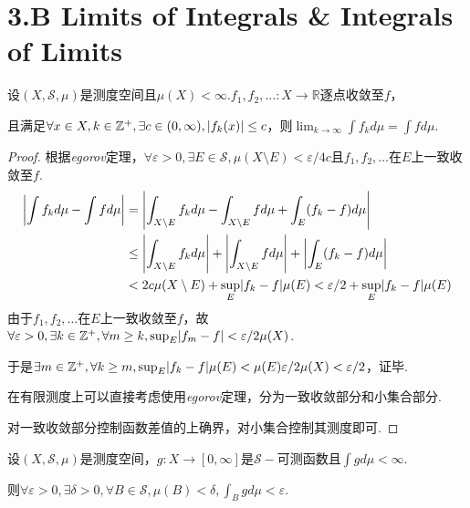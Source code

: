 \section{3.B Limits of Integrals \& Integrals of Limits}

\begin{theorem}[3.26]\label{3.26}
    设\((X, \mathcal{S}, \mu)\)是测度空间且\(\mu(X)<\infty\).\(f_1, f_2, \dots: X \to \mathbb{R}\)逐点收敛至\(f\)，
    
    且满足\(\forall x \in X, k \in \mathbb{Z}^+, \exists c \in (0,\infty), \abs*{f_k(x)} \leq c\)，则\(\lim_{k \to \infty} \int f_k d\mu=\int f d\mu\).
\end{theorem}

\begin{proof}
    根据\textit{egorov}定理，\(\forall \varepsilon>0, \exists E \in \mathcal{S}, \mu(X \setminus E)<\varepsilon/4c\)且\(f_1, f_2, \dots\)在\(E\)上一致收敛至\(f\).
    \begin{align*}
        \abs*{\int f_k d\mu-\int f d\mu}&=\abs*{\int_{X \setminus E} f_k d\mu-\int_{X \setminus E} f d\mu+\int_E (f_k-f) d\mu} \\
        &\leq \abs*{\int_{X \setminus E} f_k d\mu}+\abs*{\int_{X \setminus E} f d\mu}+\abs*{\int_E (f_k-f) d\mu} \\
        &<2c \mu(X \setminus E)+\sup_E \abs*{f_k-f} \mu(E)<\varepsilon/2+\sup_E \abs*{f_k-f} \mu(E)
    \end{align*}
    由于\(f_1, f_2, \dots\)在\(E\)上一致收敛至\(f\)，故\(\forall \varepsilon>0, \exists k \in \mathbb{Z}^+, \forall m \geq k, \sup_E \abs*{f_m-f}<\varepsilon/2\mu(X)\).

    于是\(\exists m \in \mathbb{Z}^+, \forall k \geq m, \sup_E \abs*{f_k-f} \mu(E)<\mu(E) \varepsilon/2\mu(X)<\varepsilon/2\)，证毕.

    {\kaishu 在有限测度上可以直接考虑使用\textit{egorov}定理，分为一致收敛部分和小集合部分.
    
    对一致收敛部分控制函数差值的上确界，对小集合控制其测度即可.}
\end{proof}

\begin{theorem}[3.28]\label{3.28}
    设\((X, \mathcal{S}, \mu)\)是测度空间，\(g: X \to [0,\infty]\)是\(\mathcal{S}-\)可测函数且\(\int g d\mu<\infty\).

    则\(\forall \varepsilon>0, \exists \delta>0, \forall B \in \mathcal{S}, \mu(B)<\delta, \int_B g d\mu<\varepsilon\).
\end{theorem}


